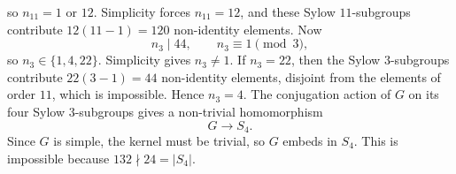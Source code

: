 \documentclass[../Odyssey_Project.tex]{subfiles}
\begin{document}
\begin{solution}
\begin{enumerate}
\[        \]
        so $n_{11}=1$ or $12$. Simplicity forces $n_{11}=12$, and these Sylow $11$-subgroups contribute $12(11-1)=120$ non-identity elements. Now
        \[
            n_3\mid 44,\qquad n_3\equiv 1\pmod 3,
        \]
        so $n_3\in\{1,4,22\}$. Simplicity gives $n_3\neq 1$. If $n_3=22$, then the Sylow $3$-subgroups contribute $22(3-1)=44$ non-identity elements, disjoint from the elements of order $11$, which is impossible. Hence $n_3=4$. The conjugation action of $G$ on its four Sylow $3$-subgroups gives a non-trivial homomorphism
        \[
            G\to S_4.
        \]
        Since $G$ is simple, the kernel must be trivial, so $G$ embeds in $S_4$. This is impossible because $132\nmid 24=|S_4|$.
    \end{enumerate}
\end{solution}
\end{document}
